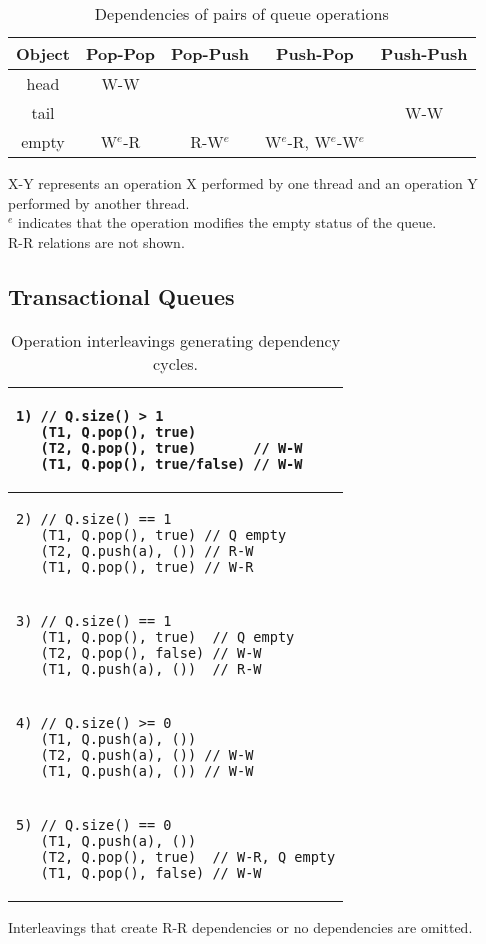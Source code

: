 \begin{table}[t]
    \centering
\begin{tabular}{c||c|c|c|c}
    Object & Pop-Pop & Pop-Push & Push-Pop & Push-Push\\
    \hline
    head & W-W & & & \\
    tail & & & & W-W\\
    empty & W$^e$-R & R-W$^e$ & W$^e$-R, W$^e$-W$^e$ & \\
\end{tabular}
    \caption*{X-Y represents an operation X performed by one thread and an operation Y performed by another thread.\\$^e$ indicates that the operation modifies the empty status of the queue.\\R-R relations are not shown.}
    \caption{Dependencies of pairs of queue operations}
    \label{table:queuesimpledeps}
\end{table}

\subsection{Transactional Queues}

\begin{table}
    \centering
    \begin{tabular}{|l|}
        \hline
\begin{lstlisting}
1) // Q.size() > 1 
   (T1, Q.pop(), true)  
   (T2, Q.pop(), true)       // W-W
   (T1, Q.pop(), true/false) // W-W
\end{lstlisting}
       \\ 
    \hline
\begin{lstlisting}
2) // Q.size() == 1  
   (T1, Q.pop(), true) // Q empty  
   (T2, Q.push(a), ()) // R-W
   (T1, Q.pop(), true) // W-R
    \end{lstlisting}
       \\ 
    \hline
\begin{lstlisting}
3) // Q.size() == 1  
   (T1, Q.pop(), true)  // Q empty  
   (T2, Q.pop(), false) // W-W     
   (T1, Q.push(a), ())  // R-W     
   \end{lstlisting} 
\\
\hline
\begin{lstlisting}
4) // Q.size() >= 0 
   (T1, Q.push(a), ()) 
   (T2, Q.push(a), ()) // W-W
   (T1, Q.push(a), ()) // W-W
\end{lstlisting}
\\
\hline
\begin{lstlisting}
5) // Q.size() == 0 
   (T1, Q.push(a), ())       
   (T2, Q.pop(), true)  // W-R, Q empty
   (T1, Q.pop(), false) // W-W
\end{lstlisting}
\\
    \hline
\end{tabular}
    \caption*{Interleavings that create R-R dependencies or no dependencies are omitted.}
    \caption{Operation interleavings generating dependency cycles.}
    \label{tab:interleavings}
\end{table}

